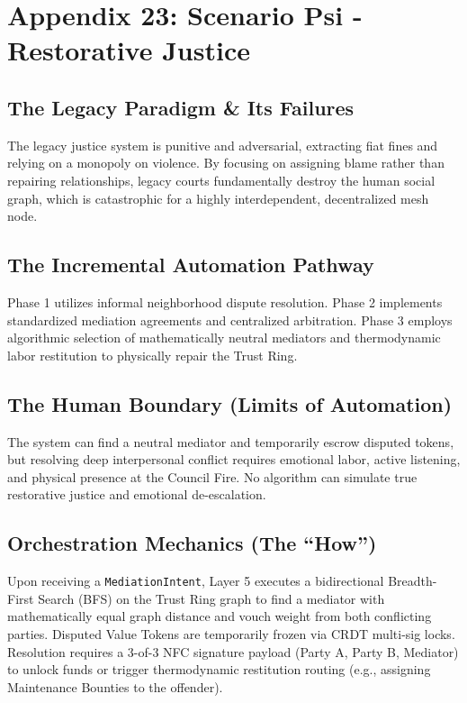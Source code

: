 \chapter{Appendix 23: Scenario Psi - Restorative Justice}

\section{The Legacy Paradigm \& Its Failures}
The legacy justice system is punitive and adversarial, extracting fiat fines and relying on a monopoly on violence. By focusing on assigning blame rather than repairing relationships, legacy courts fundamentally destroy the human social graph, which is catastrophic for a highly interdependent, decentralized mesh node.

\section{The Incremental Automation Pathway}
Phase 1 utilizes informal neighborhood dispute resolution. Phase 2 implements standardized mediation agreements and centralized arbitration. Phase 3 employs algorithmic selection of mathematically neutral mediators and thermodynamic labor restitution to physically repair the Trust Ring.

\section{The Human Boundary (Limits of Automation)}
The system can find a neutral mediator and temporarily escrow disputed tokens, but resolving deep interpersonal conflict requires emotional labor, active listening, and physical presence at the Council Fire. No algorithm can simulate true restorative justice and emotional de-escalation.

\section{Orchestration Mechanics (The ``How'')}
Upon receiving a \texttt{MediationIntent}, Layer 5 executes a bidirectional Breadth-First Search (BFS) on the Trust Ring graph to find a mediator with mathematically equal graph distance and vouch weight from both conflicting parties. Disputed Value Tokens are temporarily frozen via CRDT multi-sig locks. Resolution requires a 3-of-3 NFC signature payload (Party A, Party B, Mediator) to unlock funds or trigger thermodynamic restitution routing (e.g., assigning Maintenance Bounties to the offender).

